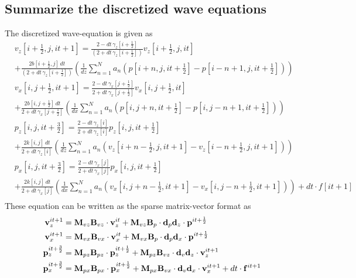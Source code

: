 \documentclass[revised,endfloat]{geophysics}
\begin{document}
\subsection{Summarize the discretized wave equations}
The discretized wave-equation is given as
\begin{equation}
\begin{split}
& v_z[i+\frac{1}{2},j,it+1] =  \frac{2- dt\, \gamma_z[i+\frac{1}{2}]}{(2+ dt\, \gamma_z[i+\frac{1}{2}])}v_z[i+\frac{1}{2},j,it] \\
&+ \frac{2b[i+\frac{1}{2},j] \, dt}{(2+ dt\, \gamma_z[i+\frac{1}{2}])} \left(\frac{1}{dz} \sum_{n=1}^N  a_n \left( p[i+n,j,it+\frac{1}{2}] - p[i-n+1,j,it+\frac{1}{2}] \right)  \right) \\
& v_x[i,j+\frac{1}{2},it+1] =  \frac{2- dt\, \gamma_x[j+\frac{1}{2}]}{2+ dt\, \gamma_x[j+\frac{1}{2}]}v_x[i,j+\frac{1}{2},it] \\
& + \frac{2b[i,j+\frac{1}{2}] \, dt}{2+ dt\, \gamma_x[j+\frac{1}{2}]}
\left( \frac{1}{dx} \sum_{n=1}^N  a_n \left( p[i,j+n,it+\frac{1}{2}] - p[i,j-n+1,it+\frac{1}{2}]\right) \right) \\
& p_z[i,j,it+\frac{3}{2}] = \frac{2-dt \, \gamma_z[i]}{2+dt \, \gamma_z[i]} p_z[i,j,it+\frac{1}{2}]  \\
& + \frac{2k[i,j] \, dt}{2+dt \, \gamma_z[i] } \left(\frac{1}{dz} \sum_{n=1}^N  a_n \left( v_z[i+n-\frac{1}{2},j,it+1] - v_z[i-n+\frac{1}{2},j,it+1] \right)  \right) \\
&p_x[i,j,it+\frac{3}{2}] = \frac{2-dt \, \gamma_x[j]}{2+dt \, \gamma_x[j]} p_x[i,j,it+\frac{1}{2}]  \\
&+ \frac{2k[i,j]\, dt}{2+dt \, \gamma_x[j]} \left(\frac{1}{dx} \sum_{n=1}^N  a_n \left(v_x[i,j+n-\frac{1}{2},it+1] - v_x[i,j-n+\frac{1}{2},it+1] \right) \right) + dt \cdot f[it+1]  \\
\end{split}
\label{eq39}
\end{equation}
These equation can be written as the sparse matrix-vector format as
\begin{equation}
\begin{split}
{\bf v}_z^{it+1} &= {\bf M}_{vz}{\bf B}_{vz}  \cdot {\bf v}_z^{it} +  {\bf M}_{vz}{\bf B}_{p} \cdot {\bf d}_p{\bf d}_z \cdot {\bf p}^{it+\frac{1}{2}} \\
{\bf v}_x^{it+1} &=  {\bf M}_{vx}{\bf B}_{vx} \cdot {\bf v}_x^{it} +  {\bf M}_{vx}{\bf B}_{p} \cdot {\bf d}_p{\bf d}_x \cdot {\bf p}^{it+\frac{1}{2}}  \\
{\bf p}_z^{it+\frac{3}{2}} &= {\bf M}_{pz}{\bf B}_{pz}  \cdot {\bf p}_z^{it+\frac{1}{2}} +  {\bf M}_{pz}{\bf B}_{vz} \cdot {\bf d}_v{\bf d}_z \cdot {\bf v}_z^{it+1}  \\
{\bf p}_x^{it+\frac{3}{2}} &=  {\bf M}_{px}{\bf B}_{px} \cdot {\bf p}_x^{it+\frac{1}{2}} +  {\bf M}_{px}{\bf B}_{vx} \cdot {\bf d}_v{\bf d}_x \cdot {\bf v}_x^{it+1} + dt \cdot {\bf f}^{it+1}  \\
\end{split}
\label{eq40}
\end{equation}
\end{document}
